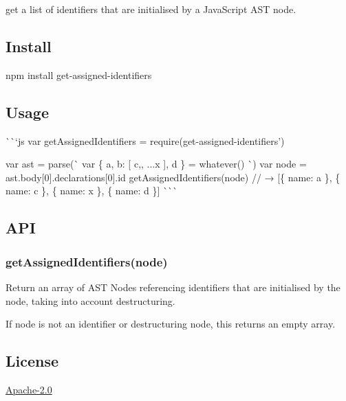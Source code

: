 get a list of identifiers that are initialised by a Java\+Script A\+ST node.

\href{https://www.npmjs.com/package/get-assigned-identifiers}{\tt } \href{https://travis-ci.org/goto-bus-stop/get-assigned-identifiers}{\tt } \href{http://npm.im/standard}{\tt }

\subsection*{Install}


\begin{DoxyCode}
npm install get-assigned-identifiers
\end{DoxyCode}


\subsection*{Usage}

\`{}\`{}`js var get\+Assigned\+Identifiers = require(\textquotesingle{}get-\/assigned-\/identifiers')

var ast = parse(\`{} var \{ a, b\+: \mbox{[} c,, ...x \mbox{]}, d \} = whatever() \`{}) var node = ast.\+body\mbox{[}0\mbox{]}.declarations\mbox{[}0\mbox{]}.id get\+Assigned\+Identifiers(node) // → \mbox{[}\{ name\+: \textquotesingle{}a\textquotesingle{} \}, \{ name\+: \textquotesingle{}c\textquotesingle{} \}, \{ name\+: \textquotesingle{}x\textquotesingle{} \}, \{ name\+: \textquotesingle{}d\textquotesingle{} \}\mbox{]} \`{}\`{}\`{}

\subsection*{A\+PI}

\subsubsection*{{\ttfamily get\+Assigned\+Identifiers(node)}}

Return an array of A\+ST Nodes referencing identifiers that are initialised by the {\ttfamily node}, taking into account destructuring.

If {\ttfamily node} is not an identifier or destructuring node, this returns an empty array.

\subsection*{License}

\mbox{\hyperlink{md_LICENSE}{Apache-\/2.0}} 